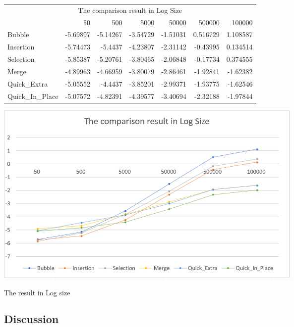 \documentclass{article}
\begin{document}
\begin{table}[htbp]
  \centering
    \begin{tabular}{l|rrrrrr}
    \multicolumn{7}{c}{The comparison result in Log Size} \\
          & 50    & 500   & 5000  & 50000  & 500000  & 100000  \\ \hline
    Bubble & -5.69897 & -5.14267 & -3.54729 & -1.51031 & 0.516729 & 1.108587 \\
    Insertion & -5.74473 & -5.4437 & -4.23807 & -2.31142 & -0.43995 & 0.134514 \\
    Selection & -5.85387 & -5.20761 & -3.80465 & -2.06848 & -0.17734 & 0.374555 \\
    Merge & -4.89963 & -4.66959 & -3.80079 & -2.86461 & -1.92841 & -1.62382 \\
    Quick\_Extra & -5.05552 & -4.4437 & -3.85201 & -2.99371 & -1.93775 & -1.62546 \\
    Quick\_In\_Place & -5.07572 & -4.82391 & -4.39577 & -3.40694 & -2.32188 & -1.97844 \\
    \end{tabular}%
  \label{tab:addlabel}%
\end{table}%

\begin{center}
    \includegraphics[height = 9cm]{result2.PNG}
    \caption{The result in Log size}
\end{center}

\subsection{Discussion}
\end{document}
